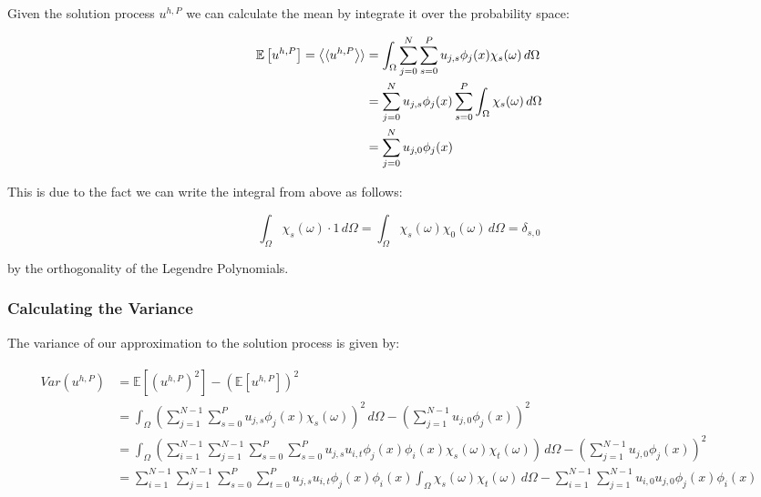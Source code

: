 Given the solution process $u^{h,P}$ we can calculate the mean by integrate it
over the probability space:

\begin{align}
  \begin{split}
    \mathbb{E}\left[u^{h,P}\right] = \left\langle\langle u^{h,P}\right\rangle\rangle &=
    \int_\Omega\sum_{j=0}^N\sum_{s=0}^Pu_{j,s}\phi_j(x)\chi_s(\omega)\, d\Omega \\
    &= \sum_{j=0}^Nu_{j,s}\phi_j(x)\sum_{s=0}^P\int_\Omega\chi_s(\omega)\, d\Omega \\
    &= \sum_{j=0}^Nu_{j,0}\phi_j(x)
  \end{split}
\end{align}

This is due to the fact we can write the integral from above as follows:

\begin{equation}
    \int_\Omega\chi_s(\omega)\cdot 1\, d\Omega =
    \int_\Omega\chi_s(\omega)\chi_0(\omega)\, d\Omega = \delta_{s,0}
\end{equation}

by the orthogonality of the Legendre Polynomials.

\subsubsection{Calculating the Variance}

The variance of our approximation to the solution process is given by:

\begin{align}
  \begin{split}
    Var(u^{h,P}) &= \mathbb{E}\left[\left(u^{h,P}\right)^2\right]
                    - \left(\mathbb{E}\left[u^{h,P}\right]\right)^2 \\
      &= \int_\Omega\left(\sum_{j=1}^{N - 1}\sum_{s=0}^Pu_{j,s}\phi_j(x)\chi_s(\omega)\right)^2\, d\Omega
        - \left(\sum_{j=1}^{N - 1}u_{j,0}\phi_j(x)\right)^2 \\
      &= \int_\Omega\left(\sum_{i=1}^{N - 1}\sum_{j=1}^{N - 1}\sum_{s=0}^P\sum_{s=0}^P
           u_{j,s}u_{i,t}\phi_j(x)\phi_i(x)\chi_s(\omega)\chi_t(\omega)
         \right)\, d\Omega - \left(\sum_{j=1}^{N - 1}u_{j,0}\phi_j(x)\right)^2 \\
      &= \sum_{i=1}^{N - 1}\sum_{j=1}^{N - 1}\sum_{s=0}^P\sum_{t=0}^Pu_{j,s}u_{i,t}
            \phi_j(x)\phi_i(x)\int_\Omega\chi_s(\omega)\chi_t(\omega)\, d\Omega
            - \sum_{i=1}^{N - 1}\sum_{j=1}^{N - 1}u_{i,0}u_{j,0}\phi_j(x)\phi_i(x)
  \end{split}
\end{align}

